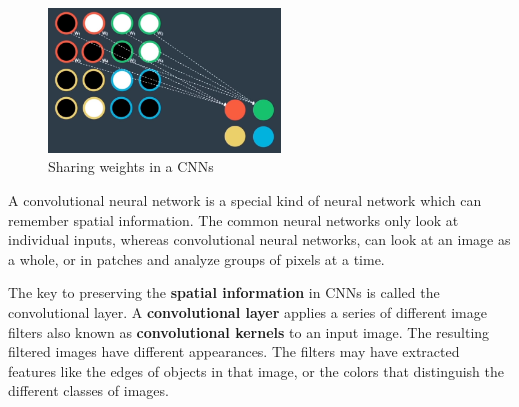 \documentclass{article}
\begin{document}
\begin{figure}[ht]
    \centering
    \includegraphics[width=0.55\textwidth,height=0.55\textheight,keepaspectratio]{images/shared_weights.png}
    \captionsetup{justification=centering}
    \caption{Sharing weights in a CNNs}
    \label{fig:f10}
\end{figure}

A convolutional neural network is a special kind of neural network which can remember spatial information. The common neural networks only look at individual inputs, whereas convolutional neural networks, can look at an image as a whole, or in patches and analyze groups of pixels at a time.

The key to preserving the \textbf{spatial information} in CNNs is called the convolutional layer. A \textbf{convolutional layer} applies a series of different image filters also known as \textbf{convolutional kernels} to an input image. The resulting filtered images have different appearances. The filters may have extracted features like the edges of objects in that image, or the colors that distinguish the different classes of images.

\printbibliography
\end{document}
